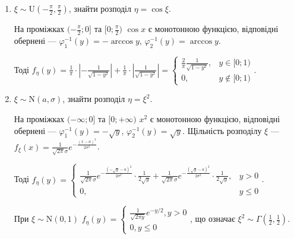 \begin{example}
    \begin{enumerate}
        \item $\xi \sim \mathrm{U}(-\frac{\pi}{2}, \frac{\pi}{2})$, знайти розподіл $\eta = \cos\xi$.

        На проміжках $(-\frac{\pi}{2}; 0]$ та $[0; \frac{\pi}{2})$ $\cos x$ є монотонною функцією, 
        відповідні обернені --- $\varphi_1^{-1} (y) = -\arccos y$, $\varphi_2^{-1} (y) = \arccos y$.

        Тоді $f_\eta (y) = \frac{1}{\pi} \cdot \left| - \frac{1}{\sqrt{1-y^2}}\right| + \frac{1}{\pi} \cdot \left|\frac{1}{\sqrt{1-y^2}}\right| = \begin{cases}
            \frac{2}{\pi} \frac{1}{\sqrt{1-y^2}}, & y \in [0; 1) \\
            0, & y \notin [0; 1)
        \end{cases}$.
        \item $\xi \sim \mathrm{N}(a, \sigma)$, знайти розподіл $\eta = \xi^2$.

        На проміжках $(-\infty; 0]$ та $[0; +\infty)$ $x^2$ є монотонною функцією, 
        відповідні обернені --- $\varphi_1^{-1} (y) = -\sqrt{y}$, $\varphi_2^{-1} (y) = \sqrt{y}$.
        Щільність розподілу $\xi$ --- $f_\xi (x) = \frac{1}{\sqrt{2\pi}\sigma} e^{-\frac{(x-a)^2}{2\sigma^2}}$.

        Тоді $f_\eta (y) = \begin{cases}
            \frac{1}{\sqrt{2\pi}\sigma} e^{-\frac{(-\sqrt{y}-a)^2}{2\sigma^2}} \cdot \frac{1}{2\sqrt{y}} + 
        \frac{1}{\sqrt{2\pi}\sigma} e^{-\frac{(\sqrt{y}-a)^2}{2\sigma^2}} \cdot \frac{1}{2\sqrt{y}}, & y > 0 \\
        0, & y \leq 0
        \end{cases}$.

        При $\xi \sim \mathrm{N}(0, 1)$ $f_\eta(y) = \begin{cases}
            \frac{1}{\sqrt{2\pi y}} e^{-y/2}, y > 0 \\
            0, y \leq 0
        \end{cases}$, що означає $\xi^2 \sim \Gamma(\frac{1}{2}, \frac{1}{2})$.
    \end{enumerate}
\end{example}

